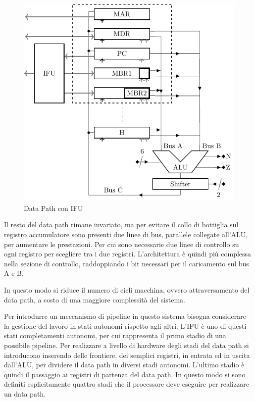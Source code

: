 \documentclass{article}
\numberwithin{equation}{subsection}
\begin{document}
\begin{figure}[H]%
    \centering%
    \includegraphics{data-path-ifu.pdf}%
    \caption{Data Path con IFU}%
\end{figure}

Il resto del data path rimane invariato, ma per evitare il collo di bottiglia sul registro accumulatore sono presenti due linee di bus, parallele collegate all'ALU, per 
aumentare le prestazioni. Per cui sono necessarie due linee di controllo su ogni registro per scegliere tra i due registri. L'architettura è quindi più complessa nella sezione 
di controllo, raddoppiando i bit necessari per il caricamento sul bus A e B. 

In questo modo si riduce il numero di cicli macchina, ovvero attraversamento del data path, a costo di una maggiore complessità del sistema. 

Per introdurre un meccanismo di pipeline in questo sistema bisogna considerare la gestione del lavoro in stati autonomi rispetto agli altri. L'IFU è uno di questi stati 
completamenti autonomi, per cui rappresenta il primo stadio di una possibile pipeline. Per realizzare a livello di hardware degli stadi del data path si introducono inserendo 
delle frontiere, dei semplici registri, in entrata ed in uscita dall'ALU, per dividere il data path in diversi stadi autonomi. L'ultimo stadio è quindi il passaggio ai registri 
di partenza del data path. In questo modo si sono definiti esplicitamente quattro stadi che il processore deve eseguire per realizzare un data path. 
\end{document}
